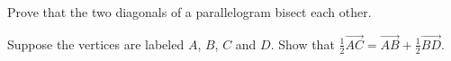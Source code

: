 
\begin{Exercise}[
name={},
title={}, 
difficulty=0,
origin={\cite{SM}}]\label{parallelogramDiag}
Prove that the two diagonals of a parallelogram bisect each other.
\end{Exercise}

\begin{Answer}
Suppose the vertices are labeled $A$, $B$, $C$ and $D$. Show that $\frac{1}{2}\overrightarrow{AC} = \overrightarrow{AB}+\frac{1}{2}\overrightarrow{BD}$.

\end{Answer}
